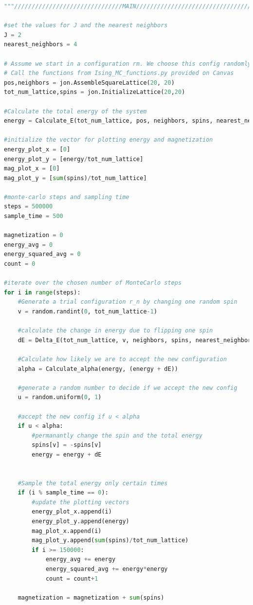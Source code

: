 \documentclass{article}
\begin{document}
\begin{lstlisting}[language=Python]
"""///////////////////////////////MAIN//////////////////////////////////////"""

#set the values for J and the nearest neighbors
J = 2
nearest_neighbors = 4

# Assume we start in a configuration rm. We choose this config randomly. 
# Call the functions from Ising_MC_functions.py provided on Canvas
pos,neighbors = jon.AssembleSquareLattice(20, 20)
tot_num_lattice,spins = jon.InitializeLattice(20,20)

#Calculate the total energy of the system
energy = Calculate_E(tot_num_lattice, pos, neighbors, spins, nearest_neighbors, J)

#initialize the vector for plotting energy and magnetization
energy_plot_x = [0]
energy_plot_y = [energy/tot_num_lattice]
mag_plot_x = [0]
mag_plot_y = [sum(spins)/tot_num_lattice]

#monte-carlo steps and sampling time
steps = 500000
sample_time = 500

magnetization = 0
energy_avg = 0
energy_squared_avg = 0
count = 0

#iterate over the chosen number of MonteCarlo steps
for i in range(steps):
    #Generate a trial configuration r_n by changing one random spin
    v = random.randint(0, tot_num_lattice-1)
    
    #calculate the change in energy due to flipping one spin
    dE = Delta_E(tot_num_lattice, v, neighbors, spins, nearest_neighbors, J)

    #Calculate how likely we are to accept the new configuration
    alpha = Calculate_alpha(energy, (energy + dE))
    
    #generate a random number to decide if we accept the new config
    u = random.uniform(0, 1)
    
    #accept the new config if u < alpha
    if u < alpha:
        #permanantly change the spin and the total energy
        spins[v] = -spins[v]
        energy = energy + dE
        
        
    #Sample the total energy only certain times
    if (i % sample_time == 0):
        #update the plotting vectors
        energy_plot_x.append(i)
        energy_plot_y.append(energy)
        mag_plot_x.append(i)
        mag_plot_y.append(sum(spins)/tot_num_lattice)
        if i >= 150000:
            energy_avg += energy
            energy_squared_avg += energy*energy
            count = count+1
        
    magnetization = magnetization + sum(spins)
    

\end{lstlisting}
\end{document}
